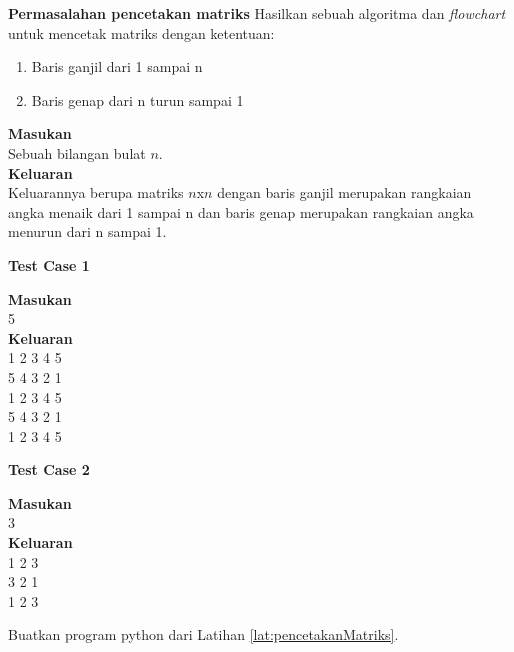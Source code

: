 \FloatBarrier
\begin{konsep}
\label{lat:pencetakanMatriks}
\textbf{Permasalahan pencetakan matriks}
Hasilkan sebuah algoritma dan \textit{flowchart} untuk mencetak matriks dengan ketentuan:
\begin{enumerate}
	\item Baris ganjil dari 1 sampai n
	\item Baris genap dari n turun sampai 1
\end{enumerate}
\textbf{Masukan}\\
Sebuah bilangan bulat $n$.\\ 
\textbf{Keluaran}\\
Keluarannya berupa matriks $n$x$n$ dengan baris ganjil merupakan rangkaian angka menaik dari 1 sampai n dan baris genap merupakan rangkaian angka menurun dari n sampai 1.\\
\begin{center}
\textbf{Test Case 1}\\
\end{center}
\textbf{Masukan}\\
5\\
\textbf{Keluaran}\\
1 2 3 4 5 \\
5 4 3 2 1 \\
1 2 3 4 5 \\
5 4 3 2 1 \\
1 2 3 4 5 \\
\begin{center}
\textbf{Test Case 2}\\
\end{center}
\textbf{Masukan}\\
3\\
\textbf{Keluaran}\\
1 2 3 \\
3 2 1 \\
1 2 3 \\
\end{konsep}

\begin{pemrograman}
Buatkan program python dari Latihan \ref{lat:pencetakanMatriks}.
\end{pemrograman}

